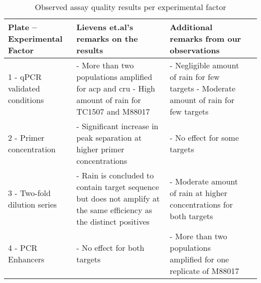 \begin{table}
    \small	
    \caption{Observed assay quality results per experimental factor}    
    \begin{tabularx}{\textwidth}{p{3.2cm}*{3}{X}}
        \toprule
        \textbf{Plate – \newline Experimental Factor}       & \textbf{Lievens et.al’s remarks on the results}                                                                                                                                                                             & \textbf{Additional remarks from our   observations}                                                                                                                                                \\ 
        \midrule
        \arrayrulecolor[rgb]{0.753,0.753,0.753}
        1 - qPCR validated conditions     & - More than two populations  amplified  for acp and cru \newline - High amount of rain for TC1507  and M88017                                                                      & - Negligible amount of rain for few   targets \newline - Moderate amount of rain for few targets \\
        \hline
        2 - Primer \newline concentration         & - Significant increase in peak   separation at higher primer concentrations                                                                                                                                                 & - No effect for some targets                                                                                                                                                                       \\
        \hline
        3 - Two-fold \newline dilution series       & - Rain is concluded to contain   target sequence but does not amplify at the same efficiency as the distinct   positives                                                                                                    & - Moderate amount of rain at higher   concentrations for both targets                                                                                                                              \\
        \hline
        4 - PCR \newline Enhancers                                                                   & - No effect for both targets                                                                                                                                                                                                & - More than two populations amplified for   one replicate of M88017                                                                                                                                \\

\end{tabularx}
\end{table}
